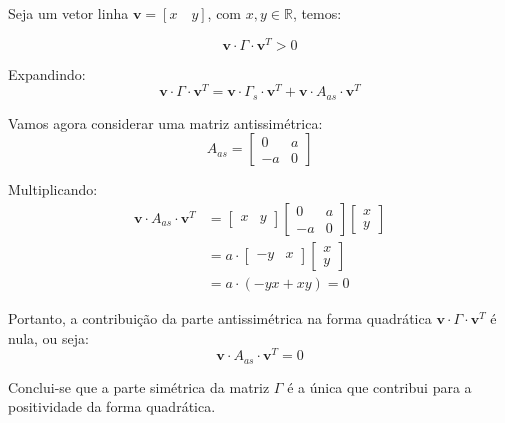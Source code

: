 \documentclass[10pt]{article}
\begin{document}
Seja um vetor linha $\mathbf{v} = [x \quad y]$, com $x, y \in \mathbb{R}$, temos:

\begin{equation}
    \mathbf{v} \cdot \Gamma \cdot \mathbf{v}^T > 0
\end{equation}

Expandindo:
\begin{equation}
    \mathbf{v} \cdot \Gamma \cdot \mathbf{v}^T = 
    \mathbf{v} \cdot \Gamma_s \cdot \mathbf{v}^T + 
    \mathbf{v} \cdot A_{as} \cdot \mathbf{v}^T
\end{equation}

Vamos agora considerar uma matriz antissimétrica:
\begin{equation}
    A_{as} = 
    \begin{bmatrix}
        0 & a \\
        -a & 0
    \end{bmatrix}
\end{equation}

Multiplicando:
\begin{align}
    \mathbf{v} \cdot A_{as} \cdot \mathbf{v}^T &= 
    \begin{bmatrix}
        x & y
    \end{bmatrix}
    \begin{bmatrix}
        0 & a \\
        -a & 0
    \end{bmatrix}
    \begin{bmatrix}
        x \\
        y
    \end{bmatrix} \\
    &= a \cdot 
    \begin{bmatrix}
        -y & x
    \end{bmatrix}
    \begin{bmatrix}
        x \\
        y
    \end{bmatrix} \\
    &= a \cdot (-yx + xy) = 0
\end{align}

Portanto, a contribuição da parte antissimétrica na forma quadrática $\mathbf{v} \cdot \Gamma \cdot \mathbf{v}^T$ é nula, ou seja:
\begin{equation}
    \mathbf{v} \cdot A_{as} \cdot \mathbf{v}^T = 0
\end{equation}

Conclui-se que a parte simétrica da matriz $\Gamma$ é a única que contribui para a positividade da forma quadrática.
\end{document}
